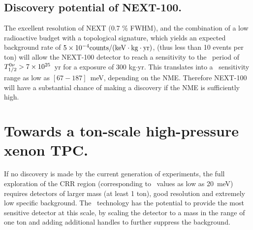 \subsection*{Discovery potential of NEXT-100.}

The excellent resolution of NEXT (0.7 \% FWHM), and the combination of a low radioactive budget with a topological signature, which yields an expected background rate of $5 \times 10^{-4} \rm counts/(keV \cdot kg \cdot yr)$, (thus less than 10 events per ton) will allow the NEXT-100 detector to reach a sensitivity to the \bbonu\ period of $T_{1/2}^{0\nu} > 7 \times 10^{25}$~yr for a exposure of 300 kg$\cdot$yr. This translates into a \mbb\ sensitivity range as low as $[67-187]$~meV, depending on the NME. Therefore NEXT-100 will have a substantial chance of making a discovery if the NME is sufficiently high. 

\section*{Towards a ton-scale high-pressure xenon TPC.}


If no discovery is made by the current generation of experiments, the full exploration of the CRR region (corresponding to \mbb\ values as low as 20~meV) requires detectors of larger mass (at least 1 ton), good resolution and extremely low specific background. The \HPXE\ technology has the potential to provide the most sensitive detector at this scale, by scaling the detector to a mass in the range of one ton and adding additional handles to further suppress the background. 

